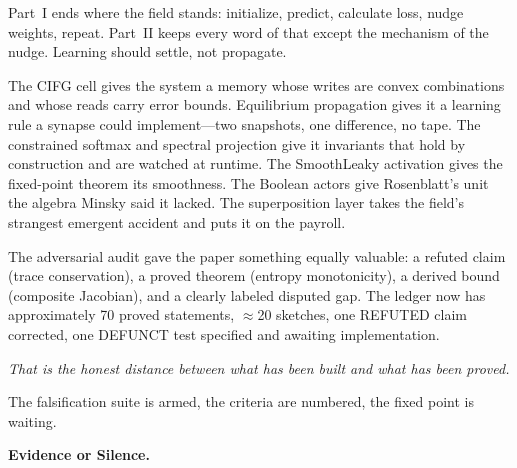 \documentclass[11pt,letterpaper]{article}
\begin{document}
Part~I ends where the field stands: initialize, predict, calculate loss, nudge
weights, repeat.  Part~II keeps every word of that except the mechanism of the
nudge.  Learning should settle, not propagate.

The CIFG cell gives the system a memory whose writes are convex combinations
and whose reads carry error bounds.  Equilibrium propagation gives it a
learning rule a synapse could implement---two snapshots, one difference, no
tape.  The constrained softmax and spectral projection give it invariants that
hold by construction and are watched at runtime.  The SmoothLeaky activation
gives the fixed-point theorem its smoothness.  The Boolean actors give
Rosenblatt's unit the algebra Minsky said it lacked.  The superposition layer
takes the field's strangest emergent accident and puts it on the payroll.

The adversarial audit gave the paper something equally valuable: a refuted claim
(trace conservation), a proved theorem (entropy monotonicity), a derived bound
(composite Jacobian), and a clearly labeled disputed gap.  The ledger now has
approximately 70 proved statements, $\approx$20 sketches, one REFUTED claim
corrected, one DEFUNCT test specified and awaiting implementation.

\textit{That is the honest distance between what has been built and what has
been proved.}

The falsification suite is armed, the criteria are numbered, the fixed point is
waiting.

\bigskip
\begin{center}\textbf{Evidence or Silence.}\end{center}
\end{document}
